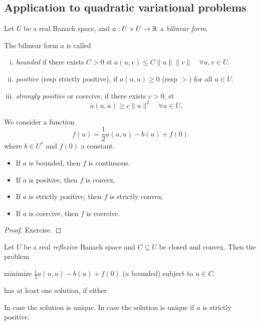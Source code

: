 \documentclass[../skript.tex]{subfiles}
\begin{document}
\subsection{Application to quadratic variational problems}
Let $U$ be a real Banach space, and $a : U \times U \to \mathbb{R}$ a \emph{bilinear form}.
\begin{definition} %
\label{def:c1e15}
The bilinear form $a$ is called
\begin{enumerate}[(i)]
\item \emph{bounded} if there exists $C > 0$ \ac{st} $a(u, v) \leq C \| u \| \| v \| \quad \forall u, v \in U$.
\item \emph{positive} (\ac{resp} strictly positive), if $a(u, u) \geq 0$ (\ac{resp} $>$) for all $u \in U$.
\item \emph{strongly positive} or coercive, if there exists $c > 0$, \ac{st}
\[
	a(u, u) \geq c \| u \|^2 \quad \forall u \in U.
\]
\end{enumerate}
\end{definition}
We consider a function
\[
	f(u) = \frac{1}{2} a(u, u) - b(u) + f(0)
\]
where $b \in U^*$ and $f(0)$ a constant.
\begin{proposition} %
\label{prop:c1e16}
\begin{itemize}
\item If $a$ is bounded, then $f$ is continuous.
\item If $a$ is positive, then $f$ is convex.
\item If $a$ is strictly positive, then $f$ is strictly convex.
\item If $a$ is coercive, then $f$ is coercive.
\end{itemize}
\end{proposition}
\begin{proof}
Exercise.
\end{proof}
\begin{proposition} %
\label{prop:c1e17}
Let $U$ be a real \emph{reflexive} Banach space and $C \subseteq U$ be closed and convex. Then the problem
\begin{mdframed}[style=theoremframing]
minimize $\frac{1}{2} a(u, u) - b(u) + f(0)$ ($a$ bounded) subject to $u \in C$.
\end{mdframed}
has at least one solution, if either
In case  the solution is unique. In case  the solution is unique if $a$ is strictly positive.
\end{proposition}
\end{document}
